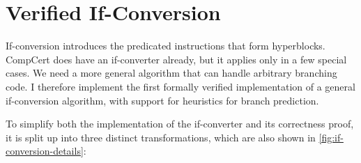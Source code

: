 
\section{Verified If-Conversion}%
\label{sec:hs:if-conversion}

If-conversion introduces the predicated instructions that form hyperblocks.
CompCert does have an if-converter already, but it applies only in a few special
cases.  We need a more general algorithm that can handle arbitrary branching
code.
I therefore implement the first formally verified implementation of a general
if-conversion algorithm, with support for heuristics for branch prediction.

To simplify both the implementation of the if-converter and its correctness
proof, it is split up into three distinct transformations, which are also shown
in
\cref{fig:if-conversion-details}:%

